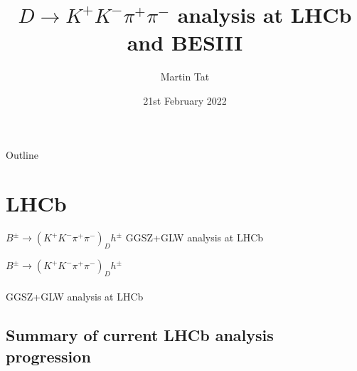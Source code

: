 \documentclass{beamer}
\title[$K^+K^-\pi^+\pi^-$]{\texorpdfstring{$D\to K^+K^-\pi^+\pi^-$}{K+K-pi+pi-} analysis at LHCb and BESIII}
\author{Martin Tat}
\institute{Oxford LHCb}
\date{21st February 2022}
\begin{document}
\begin{frame}
  \titlepage
\end{frame}

\begin{frame}{Outline}
  \tableofcontents
\end{frame}

\section{LHCb}

\begin{frame}{$B^\pm\to(K^+K^-\pi^+\pi^-)_Dh^\pm$ GGSZ+GLW analysis at LHCb}
  \begin{center}
    {\huge $B^\pm\to(K^+K^-\pi^+\pi^-)_Dh^\pm$ \\~\\GGSZ+GLW analysis at LHCb}
  \end{center}
\end{frame}

\subsection{Summary of current LHCb analysis progression}
\end{document}
